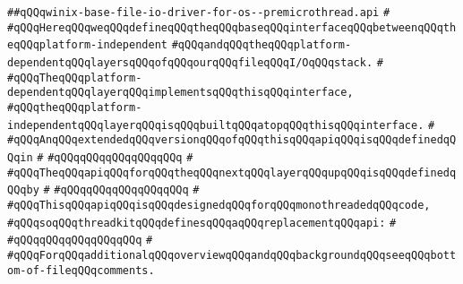\label{src/lib/std/src/io/winix-base-file-io-driver-for-os--premicrothread.api}
\verb|##qQQqwinix-base-file-io-driver-for-os--premicrothread.api|\newline
\verb|#|\newline
\verb|#qQQqHereqQQqweqQQqdefineqQQqtheqQQqbaseqQQqinterfaceqQQqbetweenqQQqtheqQQqplatform-independent|\newline
\verb|#qQQqandqQQqtheqQQqplatform-dependentqQQqlayersqQQqofqQQqourqQQqfileqQQqI/OqQQqstack.|\newline
\verb|#|\newline
\verb|#qQQqTheqQQqplatform-dependentqQQqlayerqQQqimplementsqQQqthisqQQqinterface,|\newline
\verb|#qQQqtheqQQqplatform-independentqQQqlayerqQQqisqQQqbuiltqQQqatopqQQqthisqQQqinterface.|\newline
\verb|#|\newline
\verb|#qQQqAnqQQqextendedqQQqversionqQQqofqQQqthisqQQqapiqQQqisqQQqdefinedqQQqin|\newline
\verb|#|\newline
\verb|#qQQqqQQqqQQqqQQqqQQq|\newline
\verb|#|\newline
\verb|#qQQqTheqQQqapiqQQqforqQQqtheqQQqnextqQQqlayerqQQqupqQQqisqQQqdefinedqQQqby|\newline
\verb|#|\newline
\verb|#qQQqqQQqqQQqqQQqqQQq|\newline
\verb|#|\newline
\verb|#qQQqThisqQQqapiqQQqisqQQqdesignedqQQqforqQQqmonothreadedqQQqcode,|\newline
\verb|#qQQqsoqQQqthreadkitqQQqdefinesqQQqaqQQqreplacementqQQqapi:|\newline
\verb|#|\newline
\verb|#qQQqqQQqqQQqqQQqqQQq|\newline
\verb|#|\newline
\verb|#qQQqForqQQqadditionalqQQqoverviewqQQqandqQQqbackgroundqQQqseeqQQqbottom-of-fileqQQqcomments.|\newline
\newline
